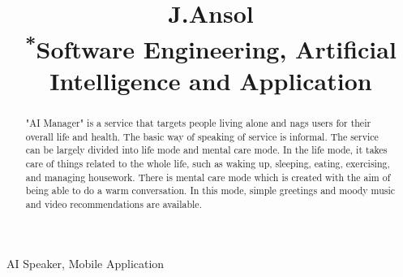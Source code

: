 \documentclass[conference]{IEEEtran}
\begin{document}
\title{J.Ansol\\
{\footnotesize \textsuperscript{*}Software Engineering, Artificial Intelligence and Application}
}

\author{
\and
{}
\and
{}
}

\maketitle

\begin{abstract}
"AI Manager" is a service that targets people living alone and nags users for their overall life and health. The basic way of speaking of service is informal. The service can be largely divided into life mode and mental care mode. In the life mode, it takes care of things related to the whole life, such as waking up, sleeping, eating, exercising, and managing housework. There is mental care mode which is created with the aim of being able to do a warm conversation. In this mode, simple greetings and moody music and video recommendations are available.\\
\end{abstract}

\begin{IEEEkeywords}
AI Speaker, Mobile Application
\\
\\
\\
\\
\end{IEEEkeywords}
\end{document}
